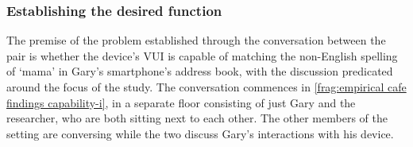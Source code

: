 


\subsubsection{Establishing the desired function}\label{sec:empirical cafe findings capability establish}
\begin{revisedsubmission}
The premise of the problem established through the conversation between the pair is whether the device's \ac{VUI} is capable of matching the non-English spelling of `mama' in Gary's smartphone's address book, with the discussion predicated around the focus of the study.
The conversation commences in \autoref{frag:empirical cafe findings capability-i}, in a separate floor consisting of just Gary and the researcher, who are both sitting next to each other.
The other members of the setting are conversing while the two discuss Gary's interactions with his device.


\end{revisedsubmission}
